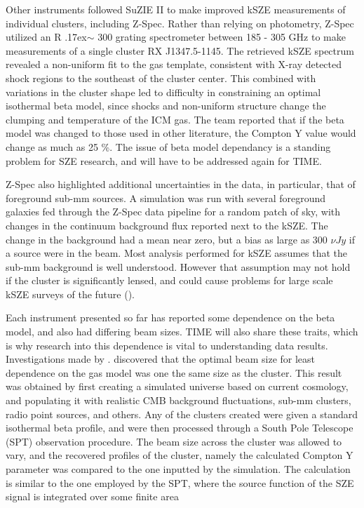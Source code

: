 \documentclass[manuscript]{aastex}
\begin{document}
Other instruments followed SuZIE II to make improved kSZE measurements of individual clusters, including Z-Spec. Rather than relying on photometry, Z-Spec utilized an R {\raise.17ex\hbox{$\scriptstyle\mathtt{\sim}$}} 300 grating spectrometer between 185 - 305 GHz to make measurements of a single cluster RX J1347.5-1145. The retrieved kSZE spectrum revealed a non-uniform fit to the gas template, consistent with X-ray detected shock regions to the southeast of the cluster center. This combined with variations in the cluster shape led to difficulty in constraining an optimal isothermal beta model, since shocks and non-uniform structure change the clumping and temperature of the ICM gas. The team reported that if the beta model was changed to those used in other literature, the Compton Y value would change as much as 25 \%. The issue of beta model dependancy is a standing problem for SZE research, and will have to be addressed again for TIME.

Z-Spec also highlighted additional uncertainties in the data, in particular, that of foreground sub-mm sources. A simulation was run with several foreground galaxies fed through the Z-Spec data pipeline for a random patch of sky, with changes in the continuum background flux reported next to the kSZE. The change in the background had a mean near zero, but a bias as large as 300 $\nu Jy$ if a source were in the beam. Most analysis performed for kSZE assumes that the sub-mm background is well understood. However that assumption may not hold if the cluster is significantly lensed, and could cause problems for large scale kSZE surveys of the future (\cite{Zemcov2012}).

Each instrument presented so far has reported some dependence on the beta model, and also had differing beam sizes. TIME will also share these traits, which is why research into this dependence is vital to understanding data results. Investigations made by \cite{Saliwanchik2015}. discovered that the optimal beam size for least dependence on the gas model was one the same size as the cluster. This result was obtained by first creating a simulated universe based on current cosmology, and populating it with realistic CMB background fluctuations, sub-mm clusters, radio point sources, and others. Any of the clusters created were given a standard isothermal beta profile, and were then processed through a South Pole Telescope (SPT) observation procedure. The beam size across the cluster was allowed to vary, and the recovered profiles of the cluster, namely the calculated Compton Y parameter was compared to the one inputted by the simulation. The calculation is similar to the one employed by the SPT, where the source function of the SZE signal is integrated over some finite area
\end{document}
